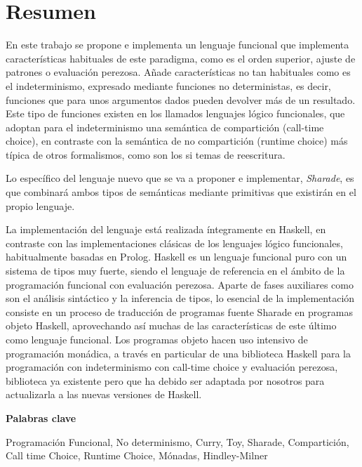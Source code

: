\documentclass[class=article, crop=false]{standalone}
\begin{document}
\section{Resumen}

En este trabajo se propone e implementa un lenguaje funcional que implementa características
habituales de este paradigma, como es el orden superior, ajuste de patrones o evaluación
perezosa. Añade características no tan habituales como es el indeterminismo, expresado
mediante funciones no deterministas, es decir, funciones que para unos argumentos dados
pueden devolver más de un resultado. Este tipo de funciones existen en los llamados lenguajes
lógico funcionales, que adoptan para el indeterminismo una semántica de compartición
(call-time choice), en contraste con la semántica de no compartición (runtime choice) más
típica de otros formalismos, como son los si temas de reescritura.

Lo específico del lenguaje nuevo que se va a proponer e implementar, \textit{Sharade}, es que
combinará ambos tipos de semánticas mediante primitivas que existirán en el propio lenguaje.

La implementación del lenguaje está realizada íntegramente en Haskell, en contraste con las
implementaciones clásicas de los lenguajes lógico funcionales, habitualmente basadas en
Prolog. Haskell es un lenguaje funcional puro con un sistema de tipos muy fuerte, siendo el
lenguaje de referencia en el ámbito de la programación funcional con evaluación perezosa.
Aparte de fases auxiliares como son el análisis sintáctico y la inferencia de tipos, lo
esencial de la implementación consiste en un proceso de traducción de programas fuente
Sharade en programas objeto Haskell, aprovechando así muchas de las características de este
último como lenguaje funcional. Los programas objeto hacen uso intensivo de programación
monádica, a través en particular de una biblioteca Haskell para la programación con
indeterminismo con call-time choice y evaluación perezosa, biblioteca ya existente pero que
ha debido ser adaptada por nosotros para actualizarla a las nuevas versiones de Haskell.

\vspace{0.5cm}
\textbf{Palabras clave}

Programación Funcional, No determinismo, Curry, Toy, Sharade, Compartición, Call time Choice,
Runtime Choice, Mónadas, Hindley-Milner
\end{document}
